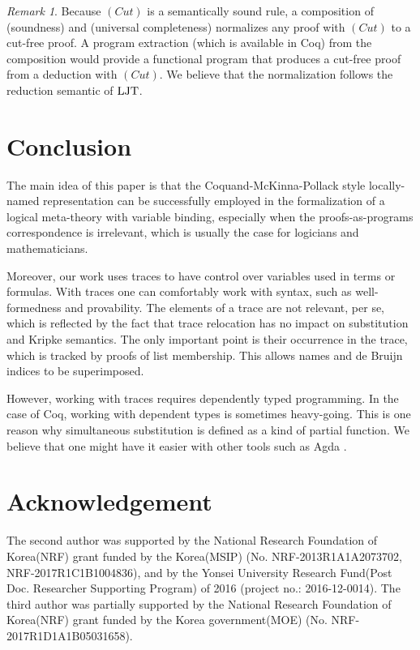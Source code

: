 \documentclass{kms-j}
\theoremstyle{plain}
\theoremstyle{remark}
\newtheorem{rem}[thm]{Remark}
\begin{document}
\begin{rem}
Because $(Cut)$ is a semantically sound rule, a composition of (soundness) and (universal completeness) normalizes any proof with $(Cut)$ to a cut-free proof.
A program extraction (which is available in Coq) from the composition would provide a functional program that produces a cut-free proof from a deduction with $(Cut)$. We believe that the normalization follows the reduction semantic of $\textup{LJT}$.
\end{rem}

\section{Conclusion}\label{sec:conclusion}
The main idea of this paper is that the Coquand-McKinna-Pollack style locally-named representation
can be successfully employed in the formalization of a logical meta-theory with variable binding,
especially when the proofs-as-programs correspondence
is irrelevant, which is usually the case for logicians and mathematicians.

Moreover, our work uses traces to have control over variables used in terms or formulas.
With traces one can comfortably work with syntax,
such as well-formedness and provability.
The elements of a trace are not relevant, per se, which is reflected by the fact that trace relocation has no impact on substitution and Kripke semantics.
The only important point is their occurrence in the trace, which is tracked by proofs of list membership.
This allows names and de Bruijn indices to be superimposed.

However, working with traces requires dependently typed programming.
In the case of Coq, working with dependent types is sometimes heavy-going.
This is one reason why simultaneous substitution is defined
as a kind of partial function.
We believe that one might have it easier with other tools such as Agda \cite{Norell2009}.

\section*{Acknowledgement}
The second author was supported by the National Research Foundation of
Korea(NRF) grant funded by the Korea(MSIP) (No. NRF-2013R1A1A2073702,
NRF-2017R1C1B1004836), and by the Yonsei University Research Fund(Post
Doc. Researcher Supporting Program) of 2016 (project no.:
2016-12-0014). The third author was partially supported by the
National Research Foundation of Korea(NRF) grant funded by the Korea
government(MOE) (No. NRF-2017R1D1A1B05031658).
\end{document}
